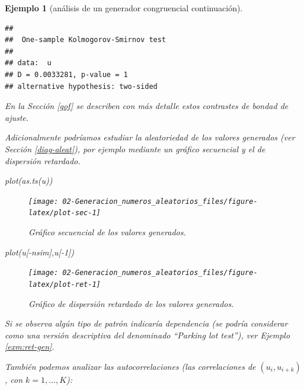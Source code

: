 \documentclass[
]{book}
\newenvironment{Shaded}{\begin{snugshade}}{\end{snugshade}}
\newcommand{\DecValTok}[1]{\textcolor[rgb]{0.00,0.00,0.81}{#1}}
\newcommand{\FunctionTok}[1]{\textcolor[rgb]{0.00,0.00,0.00}{#1}}
\newcommand{\NormalTok}[1]{#1}
\newcommand{\SpecialCharTok}[1]{\textcolor[rgb]{0.00,0.00,0.00}{#1}}
\theoremstyle{break}
\newtheorem{example}{Ejemplo}[chapter]
\theoremstyle{nonumberplain}
\begin{document}
\begin{example}[análisis de un generador congruencial continuación]
\begin{verbatim}
## 
##  One-sample Kolmogorov-Smirnov test
## 
## data:  u
## D = 0.0033281, p-value = 1
## alternative hypothesis: two-sided
\end{verbatim}

En la Sección \ref{gof} se describen con más detalle estos contrastes de bondad de ajuste.

Adicionalmente podríamos estudiar la aleatoriedad de los valores generados (ver Sección \ref{diag-aleat}), por ejemplo mediante un gráfico secuencial y el de dispersión retardado.

\begin{Shaded}
\begin{Highlighting}[]
\FunctionTok{plot}\NormalTok{(}\FunctionTok{as.ts}\NormalTok{(u))}
\end{Highlighting}
\end{Shaded}

\begin{figure}[!htb]

{\centering \texttt{[image: 02-Generacion\_numeros\_aleatorios\_files/figure-latex/plot-sec-1]} 

}

\caption{Gráfico secuencial de los valores generados.}\label{fig:plot-sec}
\end{figure}

\begin{Shaded}
\begin{Highlighting}[]
\FunctionTok{plot}\NormalTok{(u[}\SpecialCharTok{{-}}\NormalTok{nsim],u[}\SpecialCharTok{{-}}\DecValTok{1}\NormalTok{])}
\end{Highlighting}
\end{Shaded}

\begin{figure}[!htb]

{\centering \texttt{[image: 02-Generacion\_numeros\_aleatorios\_files/figure-latex/plot-ret-1]} 

}

\caption{Gráfico de dispersión retardado de los valores generados.}\label{fig:plot-ret}
\end{figure}

Si se observa algún tipo de patrón indicaría dependencia (se podría considerar como una versión descriptiva del denominado ``Parking lot test''), ver Ejemplo \ref{exm:ret-gen}.

También podemos analizar las autocorrelaciones (las correlaciones de \((u_{i},u_{i+k})\), con \(k=1,\ldots,K\)):


\end{example}
\end{document}
